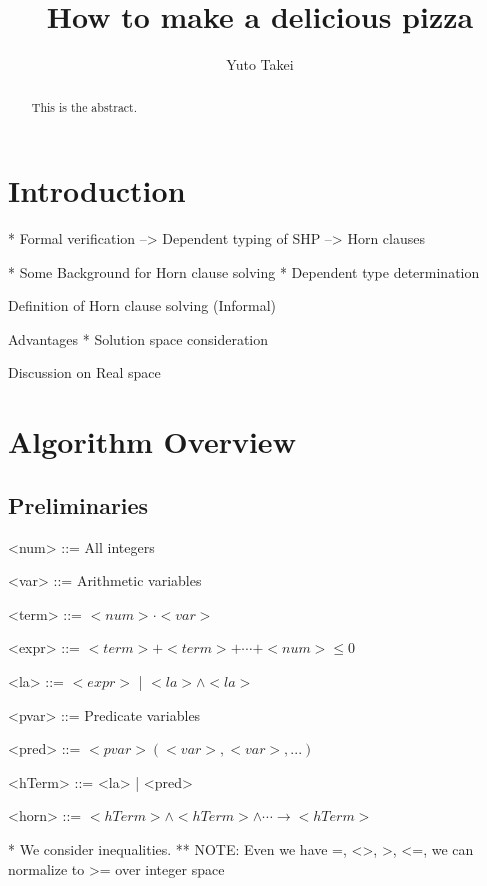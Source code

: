 \documentclass{llncs}
\title{How to make a delicious pizza}
\author{Yuto Takei}
\institute{The University of Tokyo}
\begin{document}
\maketitle

\begin{abstract}
  This is the abstract.
\end{abstract}

\section{Introduction}

* Formal verification
--> Dependent typing of SHP
--> Horn clauses

* Some
Background for Horn clause solving
* Dependent type determination

Definition of Horn clause solving (Informal)

Advantages
* Solution space consideration


Discussion on Real space


\section{Algorithm Overview}

\subsection{Preliminaries}

\setlength{\grammarparsep}{-2pt}
\setlength{\grammarindent}{6em}
\begin{grammar}

<num> ::= All integers

<var> ::= Arithmetic variables

<term> ::= $<num> \cdot <var>$

<expr> ::=  $<term> + <term> + \cdots + <num> \leq 0$

<la> ::= $<expr>$ | $<la> \wedge <la>$

<pvar> ::= Predicate variables

<pred> ::= $<pvar> ( <var>, <var>, ... )$

<hTerm> ::= <la> | <pred>

<horn> ::= $<hTerm> \wedge <hTerm> \wedge \cdots \longrightarrow <hTerm>$

\end{grammar}



* We consider inequalities.
** NOTE: Even we have =, <>, >, <=, we can normalize to >=
         over integer space
\end{document}
